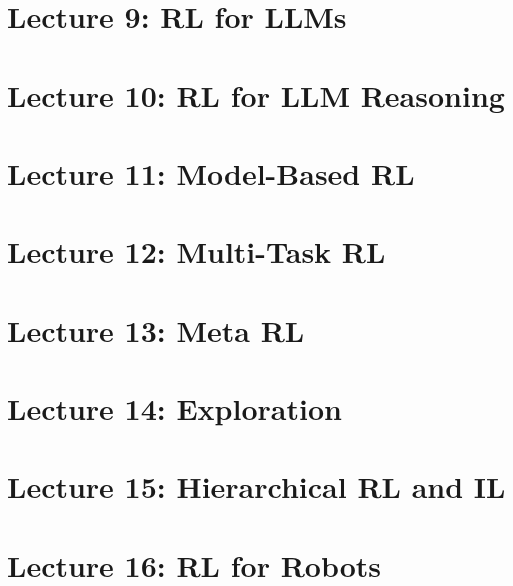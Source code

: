 \documentclass[a4paper]{article}
\begin{document}
\section{Lecture 9: RL for LLMs}


\section{Lecture 10: RL for LLM Reasoning}


\section{Lecture 11: Model-Based RL}


\section{Lecture 12: Multi-Task RL}


\section{Lecture 13: Meta RL}


\section{Lecture 14: Exploration}


\section{Lecture 15: Hierarchical RL and IL}


\section{Lecture 16: RL for Robots}

\end{document}
